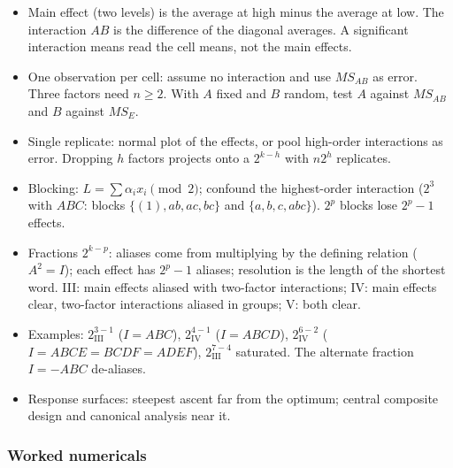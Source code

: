 \begin{notebox}
\begin{itemize}
  \item Main effect (two levels) is the average at high minus the average at low. The interaction $AB$ is the difference of the diagonal averages. A significant interaction means read the cell means, not the main effects.
  \item One observation per cell: assume no interaction and use $MS_{AB}$ as error. Three factors need $n\ge2$. With $A$ fixed and $B$ random, test $A$ against $MS_{AB}$ and $B$ against $MS_E$.
  \item Single replicate: normal plot of the effects, or pool high-order interactions as error. Dropping $h$ factors projects onto a $2^{k-h}$ with $n2^h$ replicates.
  \item Blocking: $L=\sum\alpha_ix_i\pmod2$; confound the highest-order interaction ($2^3$ with $ABC$: blocks $\{(1),ab,ac,bc\}$ and $\{a,b,c,abc\}$). $2^p$ blocks lose $2^p-1$ effects.
  \item Fractions $2^{k-p}$: aliases come from multiplying by the defining relation ($A^2=I$); each effect has $2^p-1$ aliases; resolution is the length of the shortest word. III: main effects aliased with two-factor interactions; IV: main effects clear, two-factor interactions aliased in groups; V: both clear.
  \item Examples: $2^{3-1}_{\mathrm{III}}$ ($I=ABC$), $2^{4-1}_{\mathrm{IV}}$ ($I=ABCD$), $2^{6-2}_{\mathrm{IV}}$ ($I=ABCE=BCDF=ADEF$), $2^{7-4}_{\mathrm{III}}$ saturated. The alternate fraction $I=-ABC$ de-aliases.
  \item Response surfaces: steepest ascent far from the optimum; central composite design and canonical analysis near it.
\end{itemize}
\end{notebox}

\subsubsection*{Worked numericals}

